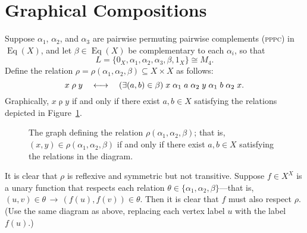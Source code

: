 \documentclass{amsart}
\theoremstyle{plain}
\theoremstyle{definition}
\theoremstyle{definition}
\numberwithin{equation}{section}
\newcommand{\<}{\ensuremath{\langle}}
\renewcommand{\>}{\ensuremath{\rangle}}
\newcommand{\Eq}{\ensuremath{\operatorname{Eq}}}
\newcommand{\rel}{\ensuremath{\mathrel}}
\newcommand{\PPPC}{\textsc{pppc}\xspace}
\begin{document}
\section{Graphical Compositions}
Suppose $\alpha_1$, $\alpha_2$, and $\alpha_3$ are pairwise permuting pairwise
complements (\PPPC) in $\Eq(X)$, and let $\beta\in \Eq(X)$ be complementary to
each 
$\alpha_i$, so that 
\[
L = \{0_X, \alpha_1, \alpha_2, \alpha_3, \beta, 1_X\} \cong M_4.
\]  
Define the relation $\rho=\rho(\alpha_1, \alpha_2, \beta)\subseteq X\times X$ as
follows:
\[
x \mathrel{\rho} y \quad \longleftrightarrow \quad (\exists (a, b) \in \beta)\;  x \rel{\alpha_1} a
\rel{\alpha_2} y \rel{\alpha_1} b \rel{\alpha_2} x.
\]
Graphically, $x \mathrel{\rho} y$ if and only if there exist $a, b \in X$
satisfying the relations depicted in Figure~\ref{fig:rho}.

\newcommand\dotsize{1pt}
\begin{figure}
  \caption{The graph defining the relation $\rho(\alpha_1, \alpha_2, \beta)$;
    that is, $(x,y) \in \rho(\alpha_1, \alpha_2, \beta)$ if and only if there
    exist $a, b \in X$ satisfying the relations in the diagram.}
  \label{fig:rho}
\end{figure}

It is clear that $\rho$ is reflexive and symmetric but not transitive.
Suppose $f\in X^X$ is a unary function that respects each relation 
$\theta \in \{\alpha_1, \alpha_2, \beta\}$---that is, 
$(u,v)\in \theta \, \longrightarrow \, (f(u), f(v))\in \theta$.  Then it is clear
that $f$ must also respect $\rho$. (Use the same diagram as above, replacing each
vertex label $u$ with the label $f(u)$.)
\end{document}
